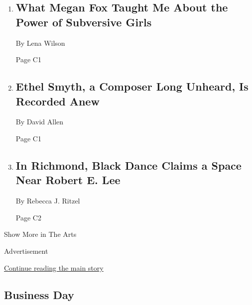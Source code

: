 \begin{enumerate}
\def\labelenumi{\arabic{enumi}.}
\item
  \href{/2020/08/06/movies/megan-fox-jennifers-body.html}{}

  \hypertarget{what-megan-fox-taught-me-about-the-power-of-subversive-girls-1}{%
  \subsection{What Megan Fox Taught Me About the Power of Subversive
  Girls}\label{what-megan-fox-taught-me-about-the-power-of-subversive-girls-1}}

  By Lena Wilson

  Page C1
\item
  \href{/2020/08/07/arts/music/ethel-smyth-prison-chandos.html}{}

  \hypertarget{ethel-smyth-a-composer-long-unheard-is-recorded-anew}{%
  \subsection{Ethel Smyth, a Composer Long Unheard, Is Recorded
  Anew}\label{ethel-smyth-a-composer-long-unheard-is-recorded-anew}}

  By David Allen

  Page C1
\item
  \href{/2020/08/06/arts/dance/richmond-virginia-lee-monument.html}{}

  \hypertarget{in-richmond-black-dance-claims-a-space-near-robert-e-lee}{%
  \subsection{In Richmond, Black Dance Claims a Space Near Robert E.
  Lee}\label{in-richmond-black-dance-claims-a-space-near-robert-e-lee}}

  By Rebecca J. Ritzel

  Page C2
\end{enumerate}

Show More in The Arts

Advertisement

\protect\hyperlink{after-mid4}{Continue reading the main story}

\hypertarget{business-day}{%
\subsection{Business Day}\label{business-day}}

